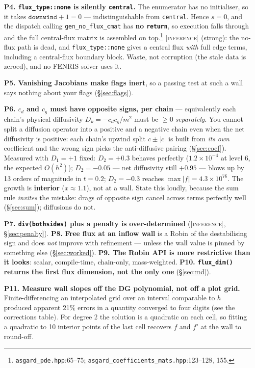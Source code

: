 \documentclass[10pt]{article}
\newcommand{\code}[1]{\texttt{#1}}
\newcommand{\INF}{\textcolor{red!60!black}{\textsc{[inference]}}}
\newcommand{\fl}[2]{\texttt{#1}:#2}
\begin{document}
\textbf{P4. \code{flux\_type::none} is silently \code{central}.} The enumerator
has no initialiser, so it takes $\code{downwind}+1=0$ --- indistinguishable from
\code{central}. Hence $s=0$, and the dispatch calling \code{gen\_no\_flux\_cmat}
has \textbf{no \code{return}}, so execution falls through and the full
central-flux matrix is assembled on top.\footnote{\fl{asgard\_pde.hpp}{65--75};
\fl{asgard\_coefficients\_mats.hpp}{123--128, 155}.} \INF{} (strong): the no-flux
path is dead, and \code{flux\_type::none} gives a central flux \emph{with} full
edge terms, including a central-flux boundary block. Waste, not corruption (the
stale data is zeroed), and no FENRIS solver uses it.

\textbf{P5. Vanishing Jacobians make flags inert}, so a passing test at such a
wall says nothing about your flags (\S\ref{sec:flags}).

\textbf{P6. $c_d$ and $c_g$ must have opposite signs, per chain} --- equivalently
each chain's physical diffusivity $D_k=-c_dc_g/m^2$ must be $\ge0$
\emph{separately}. You cannot split a diffusion operator into a positive and a
negative chain even when the net diffusivity is positive: each chain's upwind
split $c\pm|c|$ is built from \emph{its own} coefficient and the wrong sign picks
the anti-diffusive pairing (\S\ref{sec:coef}). Measured with $D_1=+1$ fixed:
$D_2=+0.3$ behaves perfectly ($1.2\times10^{-4}$ at level 6, the expected
$O(h^2)$); $D_2=-0.05$ --- net diffusivity still $+0.95$ --- blows up by 13 orders
of magnitude in $t=0.2$; $D_2=-0.3$ reaches $\max|f|=4.3\times10^{76}$. The growth
is \textbf{interior} ($x\approx1.1$), not at a wall. State this loudly, because
the sum rule \emph{invites} the mistake: drags of opposite sign cancel across
terms perfectly well (\S\ref{sec:sum}); diffusions do not.

\textbf{P7. \code{div(bothsides)} plus a penalty is over-determined} (\INF{},
\S\ref{sec:penalty}). \quad
\textbf{P8. Free flux at an inflow wall} is a Robin of the destabilising sign and
does \emph{not} improve with refinement --- unless the wall value is pinned by
something else (\S\ref{sec:worked}). \quad
\textbf{P9. The Robin API is more restrictive than it looks}: scalar,
compile-time, chain-only, mass-weighted. \quad
\textbf{P10. \code{flux\_dim()} returns the first flux dimension, not the only
one} (\S\ref{sec:md}).

\textbf{P11. Measure wall slopes off the DG polynomial, not off a plot grid.}
Finite-differencing an interpolated grid over an interval comparable to $h$
produced apparent 21\% errors in a quantity converged to four digits (see the
corrections table). For degree 2 the solution is a quadratic on each cell, so
fitting a quadratic to 10 interior points of the last cell recovers $f$ and $f'$
at the wall to round-off.
\end{document}
